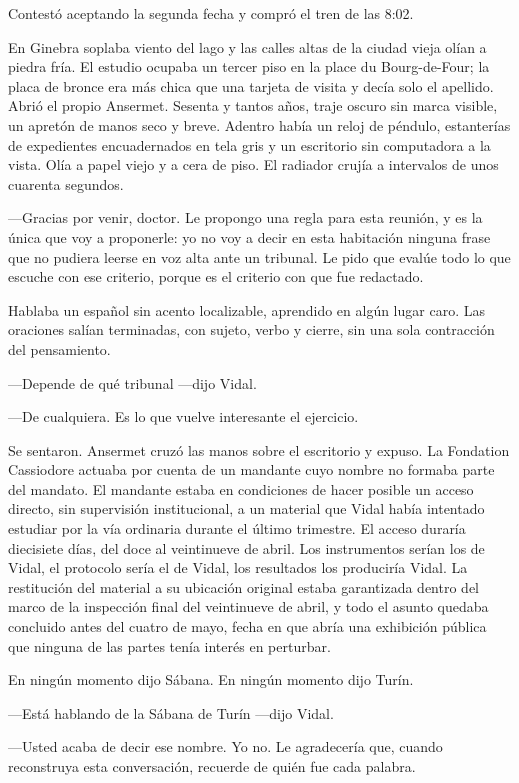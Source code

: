 Contestó aceptando la segunda fecha y compró el tren de las 8:02.

En Ginebra soplaba viento del lago y las calles altas de la ciudad vieja olían a piedra fría. El estudio ocupaba un tercer piso en la place du Bourg-de-Four; la placa de bronce era más chica que una tarjeta de visita y decía solo el apellido. Abrió el propio Ansermet. Sesenta y tantos años, traje oscuro sin marca visible, un apretón de manos seco y breve. Adentro había un reloj de péndulo, estanterías de expedientes encuadernados en tela gris y un escritorio sin computadora a la vista. Olía a papel viejo y a cera de piso. El radiador crujía a intervalos de unos cuarenta segundos.

---Gracias por venir, doctor. Le propongo una regla para esta reunión, y es la única que voy a proponerle: yo no voy a decir en esta habitación ninguna frase que no pudiera leerse en voz alta ante un tribunal. Le pido que evalúe todo lo que escuche con ese criterio, porque es el criterio con que fue redactado.

Hablaba un español sin acento localizable, aprendido en algún lugar caro. Las oraciones salían terminadas, con sujeto, verbo y cierre, sin una sola contracción del pensamiento.

---Depende de qué tribunal ---dijo Vidal.

---De cualquiera. Es lo que vuelve interesante el ejercicio.

Se sentaron. Ansermet cruzó las manos sobre el escritorio y expuso. La Fondation Cassiodore actuaba por cuenta de un mandante cuyo nombre no formaba parte del mandato. El mandante estaba en condiciones de hacer posible un acceso directo, sin supervisión institucional, a un material que Vidal había intentado estudiar por la vía ordinaria durante el último trimestre. El acceso duraría diecisiete días, del doce al veintinueve de abril. Los instrumentos serían los de Vidal, el protocolo sería el de Vidal, los resultados los produciría Vidal. La restitución del material a su ubicación original estaba garantizada dentro del marco de la inspección final del veintinueve de abril, y todo el asunto quedaba concluido antes del cuatro de mayo, fecha en que abría una exhibición pública que ninguna de las partes tenía interés en perturbar.

En ningún momento dijo Sábana. En ningún momento dijo Turín.

---Está hablando de la Sábana de Turín ---dijo Vidal.

---Usted acaba de decir ese nombre. Yo no. Le agradecería que, cuando reconstruya esta conversación, recuerde de quién fue cada palabra.

